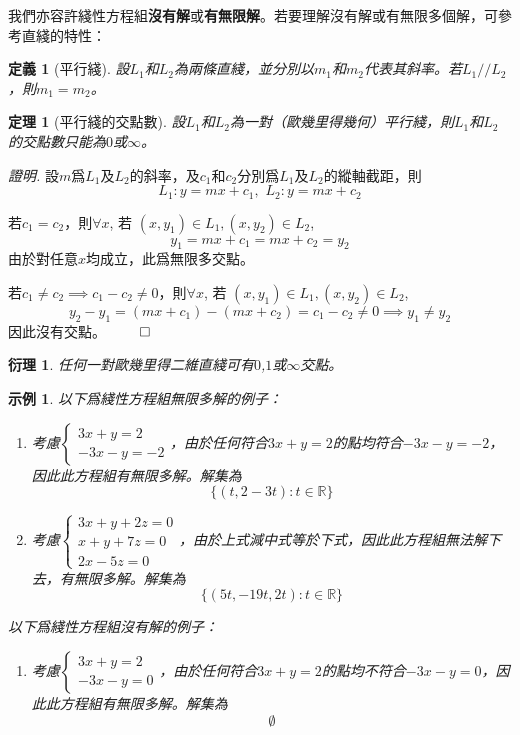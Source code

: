 \documentclass[12pt]{article}
\newtheorem{definition}{定義}
\newtheorem*{theorem}{定理}
\newtheorem*{corollary}{衍理}
\newtheorem*{example}{示例}
\renewenvironment*{proof}{\textit{證明.}}{\hfill$\qed$}
\begin{document}
    我們亦容許綫性方程組\textbf{沒有解}或\textbf{有無限解}。若要理解沒有解或有無限多個解，可參考直綫的特性：

    \begin{definition}[平行綫]
        設$L_1$和$L_2$為兩條直綫，並分別以$m_1$和$m_2$代表其斜率。若$L_1//L_2$，則$m_1=m_2$。
    \end{definition}

    \begin{theorem}[平行綫的交點數]
        設$L_1$和$L_2$為一對（歐幾里得幾何）平行綫，則$L_1$和$L_2$的交點數只能為$0$或$\infty$。
    \end{theorem}
    
    \begin{proof}
        設$m$爲$L_1$及$L_2$的斜率，及$c_1$和$c_2$分別爲$L_1$及$L_2$的縱軸截距，則$$L_1:y=mx+c_1,\,\,L_2:y=mx+c_2$$

        若$c_1=c_2$，則$\forall x$, 若 $(x,y_1)\in L_1, (x,y_2)\in L_2$, $$y_1=mx+c_1=mx+c_2=y_2$$
        由於對任意$x$均成立，此爲無限多交點。

        若$c_1\neq c_2 \implies c_1-c_2\neq 0$，則$\forall x$, 若 $(x,y_1)\in L_1, (x,y_2)\in L_2$, $$y_2-y_1=(mx+c_1)-(mx+c_2)=c_1-c_2\neq 0 \implies y_1\neq y_2$$
        因此沒有交點。
    \end{proof}

    \begin{corollary}
        任何一對歐幾里得二維直綫可有$0$,$1$或$\infty$交點。
    \end{corollary}

    \begin{example}

        以下爲綫性方程組無限多解的例子：
        \begin{enumerate}
            \item 考慮$\begin{cases}
                3x+y=2\\-3x-y=-2
            \end{cases}$，由於任何符合$3x+y=2$的點均符合$-3x-y=-2$，因此此方程組有無限多解。解集為$$\{(t,2-3t):t\in\mathbb{R}\}$$
            \item 考慮$\begin{cases}
                3x+y+2z=0\\x+y+7z=0\\2x-5z=0
            \end{cases}$，由於上式減中式等於下式，因此此方程組無法解下去，有無限多解。解集為$$\{(5t,-19t,2t):t\in\mathbb{R}\}$$
        \end{enumerate}

        
        以下爲綫性方程組沒有解的例子：\begin{enumerate}
            \item 考慮$\begin{cases}
                3x+y=2\\-3x-y=0
            \end{cases}$，由於任何符合$3x+y=2$的點均不符合$-3x-y=0$，因此此方程組有無限多解。解集為$$\emptyset$$
        \end{enumerate}
    \end{example}
\end{document}
